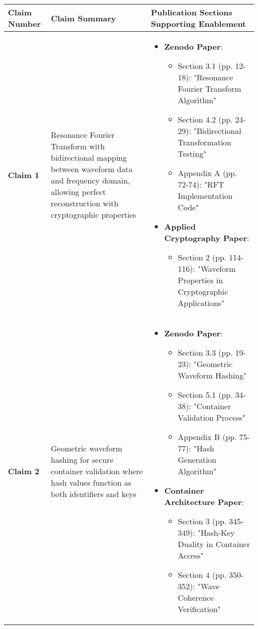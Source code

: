 \documentclass[12pt,letterpaper]{article}
\begin{document}
\begin{longtable}{|p{1in}|p{2.5in}|p{2.5in}|}
\hline
\textbf{Claim Number} & \textbf{Claim Summary} & \textbf{Publication Sections Supporting Enablement} \\
\hline
\textbf{Claim 1} & 
Resonance Fourier Transform with bidirectional mapping between waveform data and frequency domain, allowing perfect reconstruction with cryptographic properties & 
\begin{itemize}
\item \textbf{Zenodo Paper}: 
  \begin{itemize}
  \item Section 3.1 (pp. 12-18): "Resonance Fourier Transform Algorithm"
  \item Section 4.2 (pp. 24-29): "Bidirectional Transformation Testing"
  \item Appendix A (pp. 72-74): "RFT Implementation Code"
  \end{itemize}
\item \textbf{Applied Cryptography Paper}: 
  \begin{itemize}
  \item Section 2 (pp. 114-116): "Waveform Properties in Cryptographic Applications"
  \end{itemize}
\end{itemize} \\
\hline
\textbf{Claim 2} & 
Geometric waveform hashing for secure container validation where hash values function as both identifiers and keys & 
\begin{itemize}
\item \textbf{Zenodo Paper}:
  \begin{itemize}
  \item Section 3.3 (pp. 19-23): "Geometric Waveform Hashing"
  \item Section 5.1 (pp. 34-38): "Container Validation Process"
  \item Appendix B (pp. 75-77): "Hash Generation Algorithm"
  \end{itemize}
\item \textbf{Container Architecture Paper}:
  \begin{itemize}
  \item Section 3 (pp. 345-349): "Hash-Key Duality in Container Access"
  \item Section 4 (pp. 350-352): "Wave Coherence Verification"
  \end{itemize}
\end{itemize} \\

\end{longtable}
\end{document}
